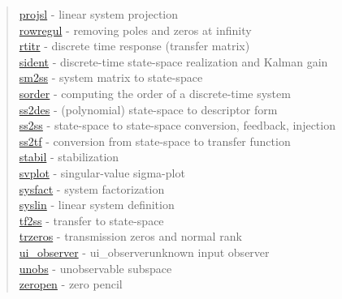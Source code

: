 \begin{quote}
\hyperlink{projsl}{projsl} - {linear system projection} \\  
\hyperlink{rowregul}{rowregul} - {removing poles and zeros at infinity} \\  
\hyperlink{rtitr}{rtitr} - {discrete time response (transfer matrix)  } \\  
\hyperlink{sident}{sident} - {discrete-time state-space realization and Kalman gain} \\  
\hyperlink{sm2ss}{sm2ss} - {system matrix to state-space} \\  
\hyperlink{sorder}{sorder} - {computing the order of a discrete-time system} \\  
\hyperlink{ss2des}{ss2des} - {(polynomial) state-space to descriptor form} \\  
\hyperlink{ss2ss}{ss2ss} - {state-space to state-space conversion, feedback, injection} \\  
\hyperlink{ss2tf}{ss2tf} - {conversion from state-space to transfer function} \\  
\hyperlink{stabil}{stabil} - {stabilization} \\  
\hyperlink{svplot}{svplot} - {singular-value sigma-plot} \\  
\hyperlink{sysfact}{sysfact} - {system factorization} \\  
\hyperlink{syslin}{syslin} - {linear system definition} \\  
\hyperlink{tf2ss}{tf2ss} - {transfer to state-space} \\  
\hyperlink{trzeros}{trzeros} - {transmission zeros and normal rank} \\  
\hyperlink{ui_observer}{ui\_observer} - {ui_observer}{unknown input observer} \\  
\hyperlink{unobs}{unobs} - {unobservable subspace} \\  
\hyperlink{zeropen}{zeropen} - {zero pencil}
\end{quote}

